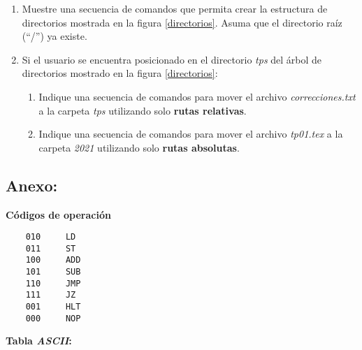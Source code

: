 \documentclass[12pt]{article}
\begin{document}
\begin{enumerate}
    \item Muestre una secuencia de comandos que permita crear la estructura de
        directorios mostrada en la figura \ref{directorios}. Asuma que el
        directorio raíz (``/'') ya existe.

    \item Si el usuario se encuentra posicionado en el directorio \emph{tps}
        del árbol de directorios mostrado en la figura \ref{directorios}:

        \begin{enumerate}

            \item Indique una secuencia de comandos para mover el archivo
                \emph{correcciones.txt} a la carpeta \emph{tps} utilizando
                solo \textbf{rutas relativas}.

            \item Indique una secuencia de comandos para mover el archivo
                \emph{tp01.tex} a la carpeta \emph{2021} utilizando
                solo \textbf{rutas absolutas}.

        \end{enumerate}


\end{enumerate}

\subsection*{ \large\textbf{Anexo:} }

\textbf{Códigos de operación}

\begin{verbatim}
    010     LD
    011     ST
    100     ADD
    101     SUB
    110     JMP
    111     JZ
    001     HLT
    000     NOP
\end{verbatim}

\textbf{Tabla \emph{ASCII}:}
\end{document}
